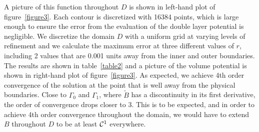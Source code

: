 \documentclass[preprint,12pt]{elsarticle}
\newcommand{\figr}[1]{figure~\ref{#1}}
\newcommand{\tabr}[1]{table~\ref{#1}}
\begin{document}
A picture of this function throughout $D$ is shown in left-hand plot of \figr{figure3}. 
Each contour is discretized with 16384 points, which is large enough to ensure the error from the evaluation of the double layer potential is negligible. We discretize the domain $D$ with a uniform grid at varying levels of refinement and we calculate the maximum error at three different values of $r$, including 2 values that are 0.001 units away from the inner and outer boundaries.  The results are shown in \tabr{table2} and a picture of the volume potential is shown in right-hand plot of \figr{figure3}. As expected, we achieve 4th order convergence of the solution at the point that is well away from the physical boundaries. Close to $\Gamma_0$ and $\Gamma_1$, where $\tilde{B}$ has a discontinuity in its first derivative, the order of convergence drops closer to 3.  This is to be expected, and in order to achieve 4th order convergence throughout the domain, we would have to extend $B$ throughout $D$ to be at least ${\cal C}^1$ everywhere.
\end{document}
